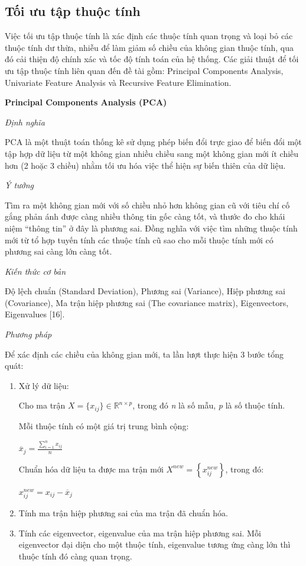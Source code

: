 \documentclass[12pt]{extarticle}
\begin{document}
		\subsection{Tối ưu tập thuộc tính}
			\par Việc tối ưu tập thuộc tính là xác định các thuộc tính quan trọng và loại bỏ các thuộc tính dư thừa, nhiễu để làm giảm số chiều của không  gian thuộc tính, qua đó cải thiện độ chính xác và tốc độ tính toán của hệ thống. Các giải thuật để tối ưu tập thuộc tính liên quan đến đề tài gồm: Principal Components Analysis, Univariate Feature Analysis và Recursive Feature Elimination.
			\par \textbf{Principal Components Analysis (PCA)}
				\par \textit{Định nghĩa} 
				\par PCA là một thuật toán thống kê sử dụng phép biến đổi trực giao để biến đổi một tập hợp dữ liệu từ một không gian nhiều chiều sang một không gian mới ít chiều hơn (2 hoặc 3 chiều) nhằm tối ưu hóa việc thể hiện sự biến thiên của dữ liệu. 
				\par  \textit{Ý tưởng}
				\par Tìm ra một không gian mới với số chiều nhỏ hơn không gian cũ với tiêu chí cố gắng phản ánh được càng nhiều thông tin gốc càng tốt, và thước đo cho khái niệm “thông tin” ở đây là phương sai. Đồng nghĩa với việc tìm những thuộc tính mới từ tổ hợp tuyến tính các thuộc tính cũ sao cho mỗi thuộc tính mới có phương sai càng lớn càng tốt. 
				\par  \textit{Kiến thức cơ bản}
				\par Độ lệch chuẩn (Standard Deviation), Phương sai (Variance), Hiệp phương sai (Covariance), Ma trận hiệp phương sai (The covariance matrix), Eigenvectors, Eigenvalues [16]. 
				\par \textit{Phương pháp}
				\par Để xác định các chiều của không gian mới, ta lần lượt thực hiện 3 bước tổng quát:
				\begin{enumerate}
					\item Xử lý dữ liệu:
					\par Cho ma trận ${X= \big\{ x_{ij} \big\}  \in  \mathbb{R}^{n \times p}}$, trong đó \textit{n} là số mẫu, \textit{p} là số thuộc tính.
					\par Mỗi thuộc tính có một giá trị trung bình cộng:
					\begin{center}
						\par ${\overline{x}_{j}=\frac{\sum_{i=1}^n{x_{ij}}}{n}}$
					\end{center}
					\par Chuẩn hóa dữ liệu ta được ma trận mới ${X^{new}=\left\{x_{ij}^{new}\right\}}$, trong đó:
					\begin{center}
						\par ${x_{ij}^{new}=x_{ij}-\overline{x}_{j}}$
					\end{center}
					\item Tính ma trận hiệp phương sai của ma trận đã chuẩn hóa.
					\item Tính các eigenvector, eigenvalue của ma trận hiệp phương sai. Mỗi eigenvector đại diện cho một thuộc tính, eigenvalue tương ứng càng lớn thì thuộc tính đó càng quan trọng.
				\end{enumerate}
\end{document}
